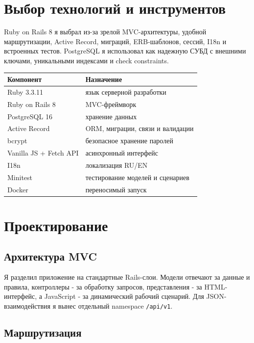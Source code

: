 \documentclass[14pt,a4paper]{extarticle}
\begin{document}
\section{Выбор технологий и инструментов}

Ruby on Rails 8 я выбрал из-за зрелой MVC-архитектуры, удобной маршрутизации, Active Record, миграций, ERB-шаблонов, сессий, I18n и встроенных тестов. PostgreSQL я использовал как надежную СУБД с внешними ключами, уникальными индексами и check constraints.

\begin{table}[H]
\centering
\begin{tabularx}{\textwidth}{lX}
\toprule
Компонент & Назначение \\
\midrule
Ruby 3.3.11 & язык серверной разработки \\
Ruby on Rails 8 & MVC-фреймворк \\
PostgreSQL 16 & хранение данных \\
Active Record & ORM, миграции, связи и валидации \\
bcrypt & безопасное хранение паролей \\
Vanilla JS + Fetch API & асинхронный интерфейс \\
I18n & локализация RU/EN \\
Minitest & тестирование моделей и сценариев \\
Docker & переносимый запуск \\
\bottomrule
\end{tabularx}
\end{table}

\section{Проектирование}
\subsection{Архитектура MVC}

Я разделил приложение на стандартные Rails-слои. Модели отвечают за данные и правила, контроллеры - за обработку запросов, представления - за HTML-интерфейс, а JavaScript - за динамический рабочий сценарий. Для JSON-взаимодействия я вынес отдельный namespace \texttt{/api/v1}.

\subsection{Маршрутизация}
\end{document}
